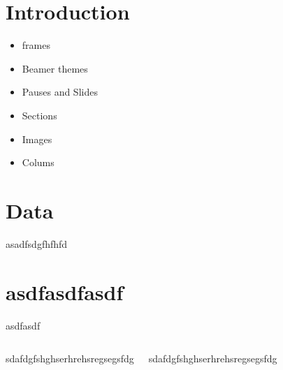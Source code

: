 




\maketitle

\section{Introduction
}
\begin{frame}

\begin{itemize}
\item frames
\item Beamer themes
\item Pauses and Slides
\item Sections
\item Images
\item Colums
\end{itemize}

\end{frame}

\section{Data}

\begin{frame}

asadfsdgfhfhfd

\end{frame}

\section{asdfasdfasdf}

\begin{frame}

asdfasdf

\end{frame}


\begin{frame}


\end{frame}

\begin{frame}

\begin{columns}

sdafdgfshghserhrehsregsegsfdg


sdafdgfshghserhrehsregsegsfdg

\end{columns}

\end{frame}




